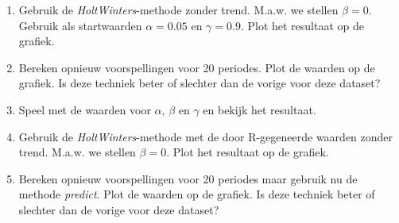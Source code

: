 \begin{exercise}
\begin{enumerate}
	\item Gebruik de \emph{HoltWinters}-methode zonder trend.  M.a.w. we stellen $\beta=0$. Gebruik als startwaarden $\alpha =  0.05$ en $\gamma = 0.9$. Plot het resultaat op de grafiek.
\item Bereken opnieuw voorspellingen voor 20 periodes. Plot de waarden op de grafiek. Is deze techniek beter of slechter dan de vorige voor deze dataset?
\item Speel met de waarden voor $\alpha$, $\beta$ en $\gamma$ en bekijk het resultaat.
	\item Gebruik de \emph{HoltWinters}-methode met de door R-gegeneerde waarden zonder trend.  M.a.w. we stellen $\beta=0$.  Plot het resultaat op de grafiek.
\item Bereken opnieuw voorspellingen voor 20 periodes maar gebruik nu de methode \emph{predict}. Plot de waarden op de grafiek. Is deze techniek beter of slechter dan de vorige voor deze dataset?
\end{enumerate}	
	
\end{exercise}

